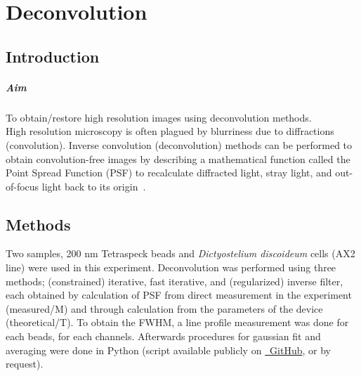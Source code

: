 
\chapter{Deconvolution}
\label{chp:Deconvolution}

\section{Introduction}

\paragraph{Aim} To obtain/restore high resolution images using deconvolution methods. 
\\

High resolution microscopy is often plagued by blurriness due to diffractions (convolution). 
Inverse convolution (deconvolution) methods can be performed to obtain convolution-free images by describing a mathematical function called the Point Spread Function (PSF) to recalculate diffracted light, stray light, and out-of-focus light back to its origin~\cite{Lect10}.  


\section{Methods}

Two samples, 200 nm Tetraspeck beads and \textit{Dictyostelium discoideum} cells (AX2 line) were used in this experiment. 
Deconvolution was performed using three methods; (constrained) iterative, fast iterative, and (regularized) inverse filter, each obtained by calculation of PSF from direct measurement in the experiment (measured/M) and through calculation from the parameters of the device (theoretical/T). 
To obtain the FWHM, a line profile measurement was done for each beads, for each channels. 
Afterwards procedures for gaussian fit and averaging were done in \faPython Python (script available publicly on \href{https://github.com/howset/LightMicro}{\faGithub~GitHub}, or by request).

